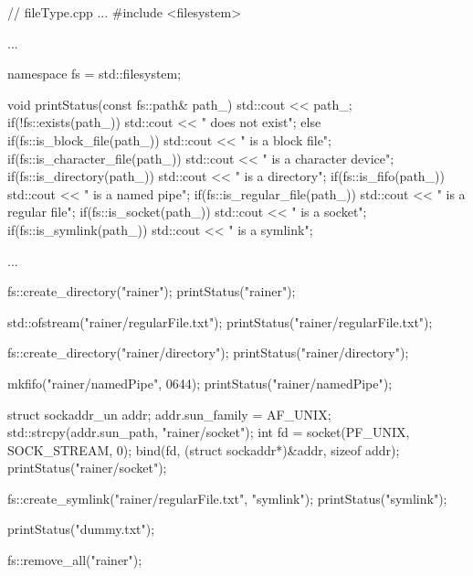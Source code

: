 \begin{cpp}
// fileType.cpp
...
#include <filesystem>

...

namespace fs = std::filesystem;

void printStatus(const fs::path& path_){
	std::cout << path_;
	if(!fs::exists(path_)) std::cout << " does not exist";
	else{
		if(fs::is_block_file(path_)) std::cout << " is a block file\n";
		if(fs::is_character_file(path_)) std::cout << " is a character device\n";
		if(fs::is_directory(path_)) std::cout << " is a directory\n";
		if(fs::is_fifo(path_)) std::cout << " is a named pipe\n";
		if(fs::is_regular_file(path_)) std::cout << " is a regular file\n";
		if(fs::is_socket(path_)) std::cout << " is a socket\n";
		if(fs::is_symlink(path_)) std::cout << " is a symlink\n";
	}
}

...

fs::create_directory("rainer");
printStatus("rainer");

std::ofstream("rainer/regularFile.txt");
printStatus("rainer/regularFile.txt");

fs::create_directory("rainer/directory");
printStatus("rainer/directory");

mkfifo("rainer/namedPipe", 0644);
printStatus("rainer/namedPipe");

struct sockaddr_un addr;
addr.sun_family = AF_UNIX;
std::strcpy(addr.sun_path, "rainer/socket");
int fd = socket(PF_UNIX, SOCK_STREAM, 0);
bind(fd, (struct sockaddr*)&addr, sizeof addr);
printStatus("rainer/socket");

fs::create_symlink("rainer/regularFile.txt", "symlink");
printStatus("symlink");

printStatus("dummy.txt");

fs::remove_all("rainer");
\end{cpp}































